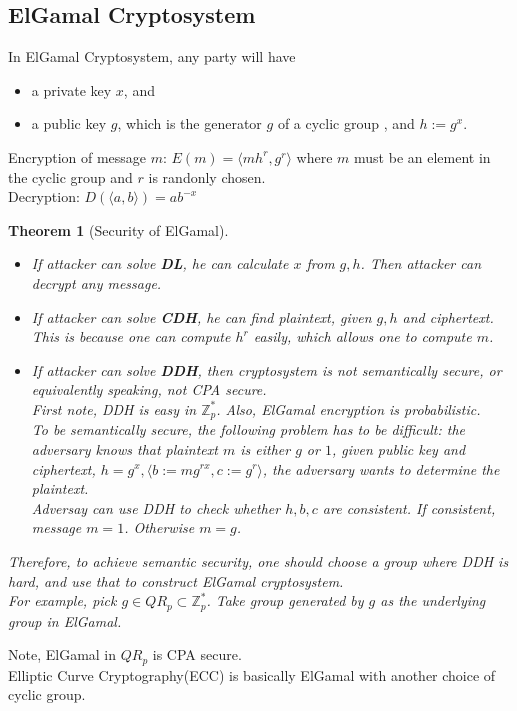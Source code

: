 \documentclass[12pt]{article}
\newtheorem{theorem}{Theorem}[section]
\theoremstyle{definition}
\begin{document}
\subsection{ElGamal Cryptosystem}
In ElGamal Cryptosystem, any party will have 
\begin{itemize}
\item a private key $x$, and
\item a public key $g$, which is the generator $g$ of a cyclic group , and $h:=g^x$.
\end{itemize}
Encryption of message $m$:
$
E(m)=\langle mh^r,g^r\rangle
$
where $m$ must be an element in the cyclic group and $r$ is randonly chosen.\\
Decryption:
$
D(\langle a,b\rangle)=ab^{-x}
$
\begin{theorem}[Security of ElGamal]
\hfill\\\normalfont \begin{itemize}
\item If attacker can solve \textbf{DL}, he can calculate $x$ from $g,h$. Then attacker can decrypt any message.
\item If attacker can solve \textbf{CDH}, he can find plaintext, given $g,h$ and ciphertext.\\
This is because one can compute $h^r$ easily, which allows one to compute $m$.
\item If attacker can solve \textbf{DDH}, then cryptosystem is not semantically secure, or equivalently speaking, not CPA secure.\\
First note, DDH is easy in $\mathbb{Z}_p^\ast$. Also, ElGamal encryption is probabilistic.\\
To be semantically secure, the following problem has to be difficult: the adversary knows that plaintext $m$ is either $g$ or $1$, given public key and ciphertext, $h=g^x, \langle b:=mg^{rx}, c:=g^r\rangle$, the adversary wants to determine the plaintext.\\
Adversay can use DDH to check whether $h,b,c$ are consistent. If consistent, message $m=1$. Otherwise $m=g$.
\end{itemize}
Therefore, to achieve semantic security, one should choose a group where DDH is hard, and use that to construct ElGamal cryptosystem.\\
For example, pick $g\in QR_p\subset\mathbb{Z}_p^\ast$. Take group generated by $g$ as the underlying group in ElGamal.
\end{theorem}
Note, ElGamal in $QR_p$ is CPA secure.\\
Elliptic Curve Cryptography(ECC) is basically ElGamal with another choice of cyclic group.
\end{document}
